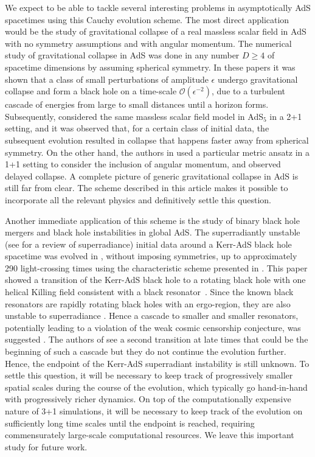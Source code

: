 \documentclass[a4paper,11pt]{article}
\numberwithin{equation}{section}
\begin{document}
We expect to be able to tackle several interesting problems in asymptotically AdS spacetimes using this Cauchy evolution scheme. The most direct application would be the study of gravitational collapse of a real massless scalar field in AdS with no symmetry assumptions and with angular momentum.
The numerical study of gravitational collapse in AdS was done in any number $D\geq 4$ of spacetime dimensions by \cite{Bizon:2011gg,Jalmuzna:2011qw} assuming spherical symmetry. 
In these papers it was shown that a class of small perturbations of amplitude $\epsilon$ undergo gravitational collapse and form a black hole on a time-scale $\mathcal{O}(\epsilon^{-2})$, due to a turbulent cascade of energies from large to small distances until a horizon forms.
Subsequently, \cite{Bantilan:2017kok} considered the same massless scalar field model in AdS$_5$ in a 2+1 setting, and it was observed that, for a certain class of initial data, the subsequent evolution resulted in collapse that happens faster away from spherical symmetry.
On the other hand, the authors in \cite{Choptuik:2017cyd} used a particular metric ansatz in a 1+1 setting to consider the inclusion of angular momentum, and observed delayed collapse.
A complete picture of generic gravitational collapse in AdS is still far from clear.
The scheme described in this article makes it possible to incorporate all the relevant physics and definitively settle this question.

Another immediate application of this scheme is the study of binary black hole mergers and black hole instabilities in global AdS.
The superradiantly unstable (see \cite{Brito:2015oca} for a review of superradiance) initial data around a Kerr-AdS black hole spacetime was evolved in \cite{Chesler:2018txn}, without imposing symmetries, up to approximately 290 light-crossing times using the characteristic scheme presented in \cite{Chesler:2013lia}. This paper showed a transition of the Kerr-AdS black hole to a rotating black hole with one helical Killing field consistent with a black resonator~\cite{Dias:2015rxy}. Since the known black resonators are rapidly rotating black holes with an ergo-region, they are also unstable to superradiance \cite{Hawking:1999dp,Green:2015kur}. Hence a cascade to smaller and smaller resonators, potentially leading to a violation of the weak cosmic censorship conjecture, was suggested \cite{Niehoff:2015oga}. 
The authors of \cite{Chesler:2018txn} see a second transition at late times that could be the beginning of such a cascade but they do not continue the evolution further. 
Hence, the endpoint of the Kerr-AdS superradiant instability is still unknown.
To settle this question, it will be necessary to keep track of progressively smaller spatial scales during the course of the evolution, which typically go hand-in-hand with progressively richer dynamics.
On top of the computationally expensive nature of 3+1 simulations, it will be necessary to keep track of the evolution on sufficiently long time scales until the endpoint is reached, requiring commensurately large-scale computational resources.
We leave this important study for future work.
\end{document}
